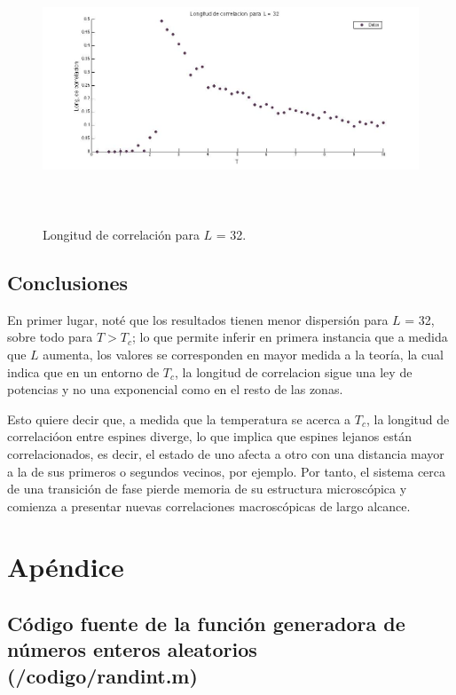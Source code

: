 \documentclass[a4paper,12pt]{article}
\begin{document}
\begin{figure}[H]
\begin{center}
\includegraphics[height=8cm,width=20cm]{../graficos/Lcorr_L32.jpg}
\caption[width=5cm]{Longitud de correlaci\'on para $L$ = 32.}
\end{center}
\end{figure}


\subsection{Conclusiones}

En primer lugar, not\'e que los resultados tienen menor dispersi\'on para $L$ = 32, sobre todo para $T > T_{c}$; lo que permite inferir en primera instancia que a medida que $L$ aumenta, los valores se corresponden en mayor medida a la teor\'ia, la cual indica que en un entorno de $T_{c}$, la longitud de correlacion sigue una ley de potencias y no una exponencial como en el resto de las zonas.

Esto quiere decir que, a medida que la temperatura se acerca a $T_{c}$, la longitud de correlaci\'oon entre espines diverge, lo que implica que espines lejanos est\'an correlacionados, es decir, el estado de uno afecta a otro con una distancia mayor a la de sus primeros o segundos vecinos, por ejemplo. Por tanto, el sistema cerca de una transici\'on 
de fase pierde memoria de su estructura microsc\'opica y comienza a presentar nuevas correlaciones macrosc\'opicas de largo alcance.


\section{Ap\'endice}

\subsection{C\'odigo fuente de la funci\'on generadora de n\'umeros enteros aleatorios (/codigo/randint.m)}
\end{document}
